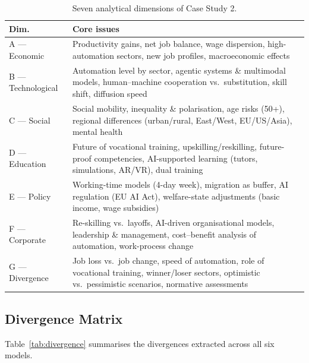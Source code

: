 \documentclass[10pt,a4paper]{article}
\begin{document}
\begin{table}[h]
\centering
\caption{Seven analytical dimensions of Case Study 2.}
\label{tab:dims}
\begin{tabularx}{\textwidth}{lX}
\toprule
\textbf{Dim.} & \textbf{Core issues} \\
\midrule
A — Economic      & Productivity gains, net job balance, wage dispersion, high-automation sectors, new job profiles, macroeconomic effects \\
B — Technological & Automation level by sector, agentic systems \& multimodal models, human–machine cooperation vs.\ substitution, skill shift, diffusion speed \\
C — Social        & Social mobility, inequality \& polarisation, age risks (50+), regional differences (urban/rural, East/West, EU/US/Asia), mental health \\
D — Education     & Future of vocational training, upskilling/reskilling, future-proof competencies, AI-supported learning (tutors, simulations, AR/VR), dual training \\
E — Policy        & Working-time models (4-day week), migration as buffer, AI regulation (EU AI Act), welfare-state adjustments (basic income, wage subsidies) \\
F — Corporate     & Re-skilling vs.\ layoffs, AI-driven organisational models, leadership \& management, cost–benefit analysis of automation, work-process change \\
G — Divergence    & Job loss vs.\ job change, speed of automation, role of vocational training, winner/loser sectors, optimistic vs.\ pessimistic scenarios, normative assessments \\
\bottomrule
\end{tabularx}
\end{table}

\subsection{Divergence Matrix}

Table~\ref{tab:divergence} summarises the divergences extracted across all six models.
\end{document}
